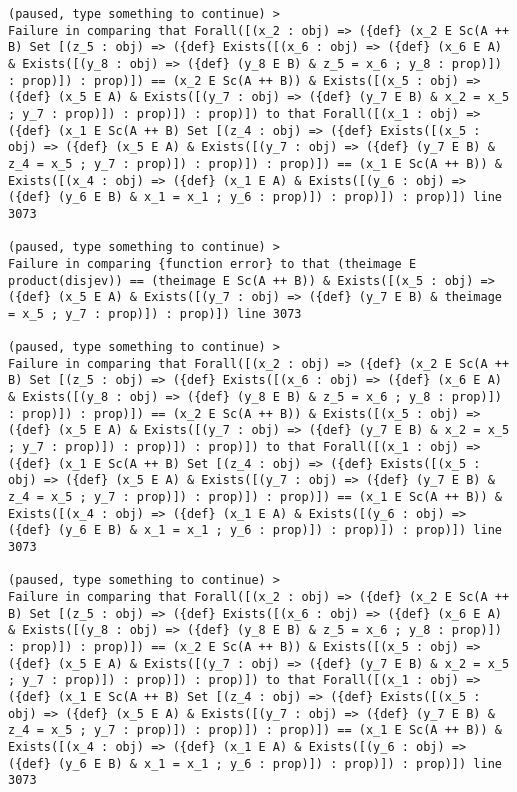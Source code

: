 \documentclass[12pt]{article}
\begin{document}
\begin{verbatim}
(paused, type something to continue) >
Failure in comparing that Forall([(x_2 : obj) => ({def} (x_2 E Sc(A ++ B) Set [(z_5 : obj) => ({def} Exists([(x_6 : obj) => ({def} (x_6 E A) & Exists([(y_8 : obj) => ({def} (y_8 E B) & z_5 = x_6 ; y_8 : prop)]) : prop)]) : prop)]) == (x_2 E Sc(A ++ B)) & Exists([(x_5 : obj) => ({def} (x_5 E A) & Exists([(y_7 : obj) => ({def} (y_7 E B) & x_2 = x_5 ; y_7 : prop)]) : prop)]) : prop)]) to that Forall([(x_1 : obj) => ({def} (x_1 E Sc(A ++ B) Set [(z_4 : obj) => ({def} Exists([(x_5 : obj) => ({def} (x_5 E A) & Exists([(y_7 : obj) => ({def} (y_7 E B) & z_4 = x_5 ; y_7 : prop)]) : prop)]) : prop)]) == (x_1 E Sc(A ++ B)) & Exists([(x_4 : obj) => ({def} (x_1 E A) & Exists([(y_6 : obj) => ({def} (y_6 E B) & x_1 = x_1 ; y_6 : prop)]) : prop)]) : prop)]) line 3073

(paused, type something to continue) >
Failure in comparing {function error} to that (theimage E product(disjev)) == (theimage E Sc(A ++ B)) & Exists([(x_5 : obj) => ({def} (x_5 E A) & Exists([(y_7 : obj) => ({def} (y_7 E B) & theimage = x_5 ; y_7 : prop)]) : prop)]) line 3073

(paused, type something to continue) >
Failure in comparing that Forall([(x_2 : obj) => ({def} (x_2 E Sc(A ++ B) Set [(z_5 : obj) => ({def} Exists([(x_6 : obj) => ({def} (x_6 E A) & Exists([(y_8 : obj) => ({def} (y_8 E B) & z_5 = x_6 ; y_8 : prop)]) : prop)]) : prop)]) == (x_2 E Sc(A ++ B)) & Exists([(x_5 : obj) => ({def} (x_5 E A) & Exists([(y_7 : obj) => ({def} (y_7 E B) & x_2 = x_5 ; y_7 : prop)]) : prop)]) : prop)]) to that Forall([(x_1 : obj) => ({def} (x_1 E Sc(A ++ B) Set [(z_4 : obj) => ({def} Exists([(x_5 : obj) => ({def} (x_5 E A) & Exists([(y_7 : obj) => ({def} (y_7 E B) & z_4 = x_5 ; y_7 : prop)]) : prop)]) : prop)]) == (x_1 E Sc(A ++ B)) & Exists([(x_4 : obj) => ({def} (x_1 E A) & Exists([(y_6 : obj) => ({def} (y_6 E B) & x_1 = x_1 ; y_6 : prop)]) : prop)]) : prop)]) line 3073

(paused, type something to continue) >
Failure in comparing that Forall([(x_2 : obj) => ({def} (x_2 E Sc(A ++ B) Set [(z_5 : obj) => ({def} Exists([(x_6 : obj) => ({def} (x_6 E A) & Exists([(y_8 : obj) => ({def} (y_8 E B) & z_5 = x_6 ; y_8 : prop)]) : prop)]) : prop)]) == (x_2 E Sc(A ++ B)) & Exists([(x_5 : obj) => ({def} (x_5 E A) & Exists([(y_7 : obj) => ({def} (y_7 E B) & x_2 = x_5 ; y_7 : prop)]) : prop)]) : prop)]) to that Forall([(x_1 : obj) => ({def} (x_1 E Sc(A ++ B) Set [(z_4 : obj) => ({def} Exists([(x_5 : obj) => ({def} (x_5 E A) & Exists([(y_7 : obj) => ({def} (y_7 E B) & z_4 = x_5 ; y_7 : prop)]) : prop)]) : prop)]) == (x_1 E Sc(A ++ B)) & Exists([(x_4 : obj) => ({def} (x_1 E A) & Exists([(y_6 : obj) => ({def} (y_6 E B) & x_1 = x_1 ; y_6 : prop)]) : prop)]) : prop)]) line 3073


\end{verbatim}
\end{document}
